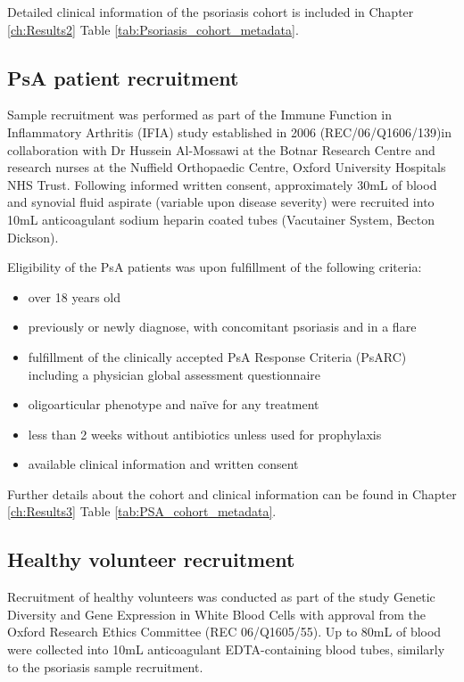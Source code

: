 Detailed clinical information of the psoriasis cohort is included in Chapter \ref{ch:Results2} Table \ref{tab:Psoriasis_cohort_metadata}.



\subsection{PsA patient recruitment}

Sample recruitment was performed as part of the Immune Function in Inflammatory Arthritis (IFIA) study established in 2006 (REC/06/Q1606/139)in collaboration with Dr Hussein Al-Mossawi at the Botnar Research Centre and research nurses at the Nuffield Orthopaedic Centre, Oxford University Hospitals NHS Trust. Following informed written consent, approximately 30mL of blood and synovial fluid aspirate (variable upon disease severity) were recruited into 10mL anticoagulant sodium heparin coated tubes (Vacutainer System, Becton Dickson).

Eligibility of the PsA patients was upon fulfillment of the following criteria:
\begin{itemize}
  \item over 18 years old
  \item previously or newly diagnose, with concomitant psoriasis and in a flare
	\item fulfillment of the clinically accepted PsA Response Criteria (PsARC) including a physician global assessment questionnaire \parencite{Philipp2011,Clegg1996}
	\item oligoarticular phenotype and na\"{i}ve for any treatment %
	\item less than 2 weeks without antibiotics unless used for prophylaxis %
	\item available clinical information and written consent
\end{itemize}

Further details about the cohort and clinical information can be found in Chapter \ref{ch:Results3} Table \ref{tab:PSA_cohort_metadata}.

\subsection{Healthy volunteer recruitment}
Recruitment of healthy volunteers was conducted as part of the study Genetic Diversity and Gene Expression in White Blood Cells with approval from the Oxford Research Ethics Committee (REC 06/Q1605/55). Up to 80mL of blood were collected into 10mL anticoagulant EDTA-containing blood tubes, similarly to the psoriasis sample recruitment.

